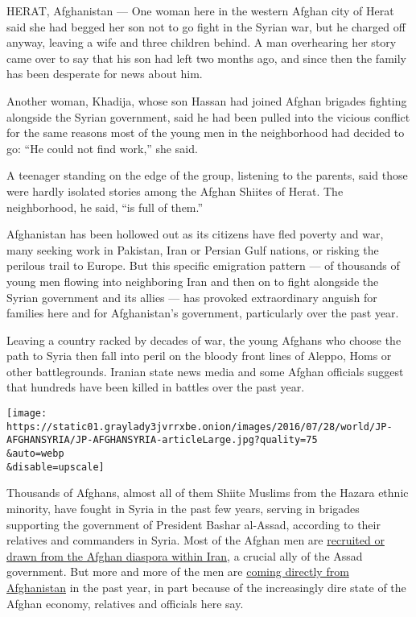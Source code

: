 HERAT, Afghanistan --- One woman here in the western Afghan city of
Herat said she had begged her son not to go fight in the Syrian war, but
he charged off anyway, leaving a wife and three children behind. A man
overhearing her story came over to say that his son had left two months
ago, and since then the family has been desperate for news about him.

Another woman, Khadija, whose son Hassan had joined Afghan brigades
fighting alongside the Syrian government, said he had been pulled into
the vicious conflict for the same reasons most of the young men in the
neighborhood had decided to go: ``He could not find work,'' she said.

A teenager standing on the edge of the group, listening to the parents,
said those were hardly isolated stories among the Afghan Shiites of
Herat. The neighborhood, he said, ``is full of them.''

Afghanistan has been hollowed out as its citizens have fled poverty and
war, many seeking work in Pakistan, Iran or Persian Gulf nations, or
risking the perilous trail to Europe. But this specific emigration
pattern --- of thousands of young men flowing into neighboring Iran and
then on to fight alongside the Syrian government and its allies --- has
provoked extraordinary anguish for families here and for Afghanistan's
government, particularly over the past year.

Leaving a country racked by decades of war, the young Afghans who choose
the path to Syria then fall into peril on the bloody front lines of
Aleppo, Homs or other battlegrounds. Iranian state news media and some
Afghan officials suggest that hundreds have been killed in battles over
the past year.

\texttt{[image: https://static01.graylady3jvrrxbe.onion/images/2016/07/28/world/JP-AFGHANSYRIA/JP-AFGHANSYRIA-articleLarge.jpg?quality=75\\\&auto=webp\\\&disable=upscale]}

Thousands of Afghans, almost all of them Shiite Muslims from the Hazara
ethnic minority, have fought in Syria in the past few years, serving in
brigades supporting the government of President Bashar al-Assad,
according to their relatives and commanders in Syria. Most of the Afghan
men are
\href{https://www.theguardian.com/world/2015/nov/05/iran-recruits-afghan-refugees-fight-save-syrias-bashar-al-assad}{recruited
or drawn from the Afghan diaspora within Iran}, a crucial ally of the
Assad government. But more and more of the men are
\href{https://www.theguardian.com/world/2016/jun/30/iran-covertly-recruits-afghan-soldiers-to-fight-in-syria}{coming
directly from Afghanistan} in the past year, in part because of the
increasingly dire state of the Afghan economy, relatives and officials
here say.

